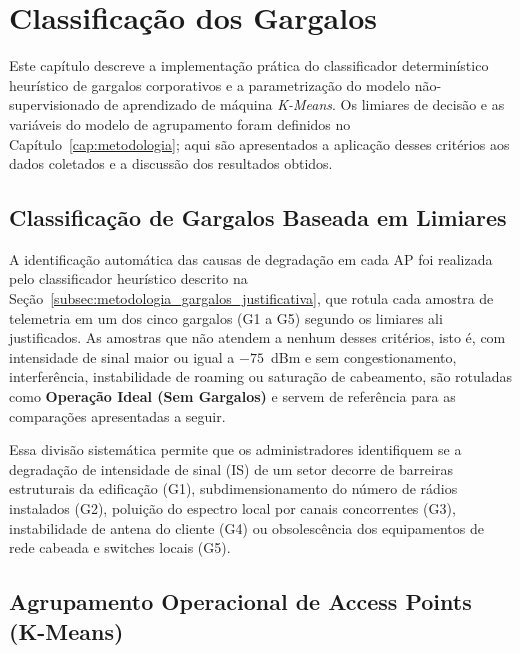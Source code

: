 \chapter{Classificação dos Gargalos}
\label{cap:classificacao}

Este capítulo descreve a implementação prática do classificador determinístico heurístico de gargalos corporativos e a parametrização do modelo não-supervisionado de aprendizado de máquina \textit{K-Means}. Os limiares de decisão e as variáveis do modelo de agrupamento foram definidos no Capítulo~\ref{cap:metodologia}; aqui são apresentados a aplicação desses critérios aos dados coletados e a discussão dos resultados obtidos.

\section{Classificação de Gargalos Baseada em Limiares}
\label{sec:classificacao_limiares_cap}

A identificação automática das causas de degradação em cada AP foi realizada pelo classificador heurístico descrito na Seção~\ref{subsec:metodologia_gargalos_justificativa}, que rotula cada amostra de telemetria em um dos cinco gargalos (G1 a G5) segundo os limiares ali justificados. As amostras que não atendem a nenhum desses critérios, isto é, com intensidade de sinal maior ou igual a $-75$~dBm e sem congestionamento, interferência, instabilidade de roaming ou saturação de cabeamento, são rotuladas como \textbf{Operação Ideal (Sem Gargalos)} e servem de referência para as comparações apresentadas a seguir.

Essa divisão sistemática permite que os administradores identifiquem se a degradação de intensidade de sinal (IS) de um setor decorre de barreiras estruturais da edificação (G1), subdimensionamento do número de rádios instalados (G2), poluição do espectro local por canais concorrentes (G3), instabilidade de antena do cliente (G4) ou obsolescência dos equipamentos de rede cabeada e switches locais (G5).

\section{Agrupamento Operacional de Access Points (K-Means)}
\label{sec:kmeans_desenvolvimento_cap}

